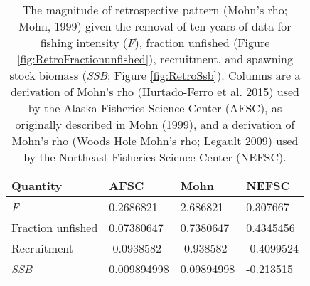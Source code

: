 
\begin{longtable}[t]{llll}
\caption{\label{tab:RetroMohnsrho}The magnitude of retrospective pattern (Mohn's rho; Mohn, 1999) given the removal of ten years of data for fishing intensity (\emph{F}), fraction unfished (Figure \ref{fig:RetroFractionunfished}),  recruitment, and spawning stock biomass (\emph{SSB}; Figure \ref{fig:RetroSsb}). Columns are a derivation of Mohn's rho (Hurtado-Ferro et al. 2015) used by the Alaska Fisheries Science Center (AFSC), as originally described in Mohn (1999), and a derivation of Mohn's rho (Woods Hole Mohn's rho; Legault 2009) used by the Northeast Fisheries Science Center (NEFSC).}\\
\toprule
Quantity & AFSC & Mohn & NEFSC\\
\midrule
\emph{F} & 0.2686821 & 2.686821 & 0.307667\\
Fraction unfished & 0.07380647 & 0.7380647 & 0.4345456\\
Recruitment & -0.0938582 & -0.938582 & -0.4099524\\
\emph{SSB} & 0.009894998 & 0.09894998 & -0.213515\\
\bottomrule
\end{longtable}
